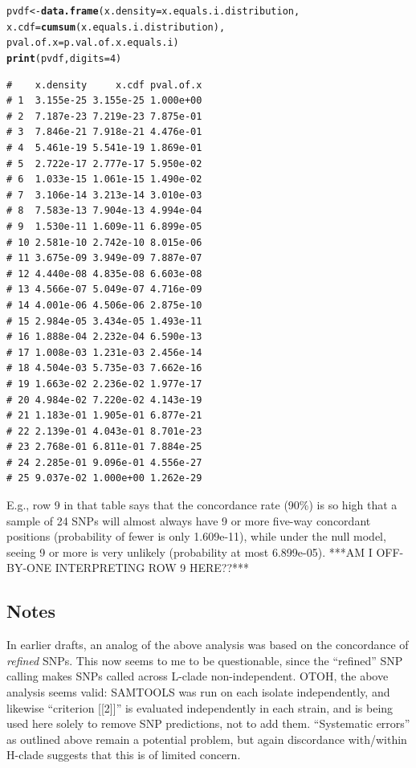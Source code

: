 \documentclass{article}\usepackage[]{graphicx}\usepackage[]{color}
\makeatletter
\newcommand{\hlnum}[1]{\textcolor[rgb]{0.686,0.059,0.569}{#1}}%
\newcommand{\hlstd}[1]{\textcolor[rgb]{0.345,0.345,0.345}{#1}}%
\newcommand{\hlkwb}[1]{\textcolor[rgb]{0.69,0.353,0.396}{#1}}%
\newcommand{\hlkwc}[1]{\textcolor[rgb]{0.333,0.667,0.333}{#1}}%
\newcommand{\hlkwd}[1]{\textcolor[rgb]{0.737,0.353,0.396}{\textbf{#1}}}%
\newenvironment{kframe}{%
 \def\at@end@of@kframe{}%
 \ifinner\ifhmode%
  \def\at@end@of@kframe{\end{minipage}}%
  \begin{minipage}{\columnwidth}%
 \fi\fi%
 \def\FrameCommand##1{\hskip\@totalleftmargin \hskip-\fboxsep
 \colorbox{shadecolor}{##1}\hskip-\fboxsep
     \hskip-\linewidth \hskip-\@totalleftmargin \hskip\columnwidth}%
 \MakeFramed {\advance\hsize-\width
   \@totalleftmargin\z@ \linewidth\hsize
   \@setminipage}}%
 {\par\unskip\endMakeFramed%
 \at@end@of@kframe}
\newenvironment{knitrout}{}{} %
\makeatother
\begin{document}
\begin{enumerate}
\begin{knitrout}\footnotesize
{}\color{fgcolor}\begin{kframe}
\begin{alltt}
\hlstd{pvdf} \hlkwb{<-} \hlkwd{data.frame}\hlstd{(}\hlkwc{x.density}\hlstd{=x.equals.i.distribution,}
                   \hlkwc{x.cdf}\hlstd{=}\hlkwd{cumsum}\hlstd{(x.equals.i.distribution),}
                   \hlkwc{pval.of.x}\hlstd{=p.val.of.x.equals.i)}
\hlkwd{print}\hlstd{(pvdf,} \hlkwc{digits}\hlstd{=}\hlnum{4}\hlstd{)}
\end{alltt}
\begin{verbatim}
#    x.density     x.cdf pval.of.x
# 1  3.155e-25 3.155e-25 1.000e+00
# 2  7.187e-23 7.219e-23 7.875e-01
# 3  7.846e-21 7.918e-21 4.476e-01
# 4  5.461e-19 5.541e-19 1.869e-01
# 5  2.722e-17 2.777e-17 5.950e-02
# 6  1.033e-15 1.061e-15 1.490e-02
# 7  3.106e-14 3.213e-14 3.010e-03
# 8  7.583e-13 7.904e-13 4.994e-04
# 9  1.530e-11 1.609e-11 6.899e-05
# 10 2.581e-10 2.742e-10 8.015e-06
# 11 3.675e-09 3.949e-09 7.887e-07
# 12 4.440e-08 4.835e-08 6.603e-08
# 13 4.566e-07 5.049e-07 4.716e-09
# 14 4.001e-06 4.506e-06 2.875e-10
# 15 2.984e-05 3.434e-05 1.493e-11
# 16 1.888e-04 2.232e-04 6.590e-13
# 17 1.008e-03 1.231e-03 2.456e-14
# 18 4.504e-03 5.735e-03 7.662e-16
# 19 1.663e-02 2.236e-02 1.977e-17
# 20 4.984e-02 7.220e-02 4.143e-19
# 21 1.183e-01 1.905e-01 6.877e-21
# 22 2.139e-01 4.043e-01 8.701e-23
# 23 2.768e-01 6.811e-01 7.884e-25
# 24 2.285e-01 9.096e-01 4.556e-27
# 25 9.037e-02 1.000e+00 1.262e-29
\end{verbatim}
\end{kframe}
\end{knitrout}

E.g., row 9 in that table says that the concordance rate (90\%) is so high that a sample of 24 SNPs will almost always have 9 or more five-way concordant positions (probability of fewer is only 1.609e-11), while under the null model, seeing 9 or more is very unlikely (probability at most 6.899e-05).  
***AM I OFF-BY-ONE INTERPRETING ROW 9 HERE??***  

\end{enumerate}

\subsection{Notes}

In earlier drafts, an analog of the above analysis was based on the concordance of \emph{refined} SNPs.  This now seems to me to be questionable, since the ``refined'' SNP calling makes SNPs called across L-clade non-independent. OTOH, the above analysis seems valid: SAMTOOLS was run on each isolate independently, and likewise ``criterion [[2]]'' is evaluated independently in each strain, and is being used here solely to remove SNP predictions, not to add them.  ``Systematic errors'' as outlined above remain a potential problem, but again discordance with/within H-clade suggests that this is of limited concern.
\end{document}
